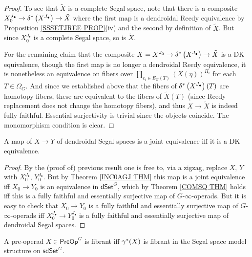 \documentclass[a4paper,10pt,draft]{article}%
\begin{document}
\begin{proof}
To see that $\tilde{X}$ is a complete Segal space, note that there is a composite
$X_0^{J_{\bullet}} \to 
\delta^{\**}\left( X^{J_{\bullet}} \right)
\to \tilde{X}$
where the first map is a dendroidal Reedy equivalence by Proposition \ref{SSSETJREE PROP}(iv)
and the second by definition of $\tilde{X}$.
But since $X_0^{J_{\bullet}}$ is a complete Segal space, so is 
$\tilde{X}$.

For the remaining claim that the composite
$X = X^{J_{0}} \to 
\delta^{\**}\left( X^{J_{\bullet}} \right)
\to \tilde{X}$
is a DK equivalence, 
though the first map is no longer a dendroidal Reedy equivalence, 
it is nonetheless an equivalence
on fibers over
$\prod_{e_i \in E_G(T)} \left(X(\eta)\right)^{H_i}$
for each $T\in \Omega_G$.
And since we established above that the fibers of
$\delta^{\**}\left( X^{J_{\bullet}} \right)(T)$
 are homotopy fibers, these are equivalent to the fibers of $\tilde{X}(T)$ (since Reedy replacement does not change the homotopy fibers), and thus $X \to \tilde{X}$ is indeed fully faithful.
Essential surjectivity is trivial since the objects coincide.
The monomorphism condition is clear.
\end{proof}


\begin{corollary}
	A map of $X \to Y$ of dendroidal Segal spaces is a joint equivalence iff it is a DK equivalence.
\end{corollary}


\begin{proof}
By the (proof of) previous result one is free to, via a zigzag, 
replace $X$, $Y$ with 
$X_0^{J_{\bullet}}$, $Y_0^{J_{\bullet}}$.
But by Theorem \ref{INC0AGJ THM} this map is a joint equivalence iff
$X_0 \to Y_0$ is an equivalence in $\mathsf{dSet}^G$, which by 
Theorem \ref{COMSQ THM} holds iff this is a fully faithful and essentially surjective map of $G$-$\infty$-operads.
But it is easy to check that
$X_0 \to Y_0$ is a fully faithful and essentially surjective map of $G$-$\infty$-operads iff
$X_0^{J_{\bullet}}\to Y_0^{J_{\bullet}}$
is a fully faithful and essentially surjective map
of dendroidal Segal spaces.
\end{proof}


\begin{corollary}
	A pre-operad $X \in \mathsf{PreOp}^G$ is fibrant iff $\gamma^{\**}(X)$ is fibrant in the Segal space model structure on 
	$\mathsf{sdSet}^G$.
\end{corollary}
\end{document}
